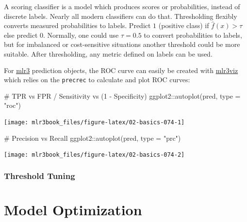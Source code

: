 \documentclass[
  11pt,
  parskip=half,
  DIV=calc,
  BCOR=10mm,
  x11names]{scrbook}
\newenvironment{Shaded}{}{}
\newcommand{\CommentTok}[1]{\textcolor[rgb]{0.00,0.50,0.00}{#1}}
\newcommand{\DataTypeTok}[1]{#1}
\newcommand{\KeywordTok}[1]{\textcolor[rgb]{0.00,0.00,1.00}{#1}}
\newcommand{\NormalTok}[1]{#1}
\newcommand{\OperatorTok}[1]{#1}
\newcommand{\StringTok}[1]{\textcolor[rgb]{0.00,0.50,0.50}{#1}}
\begin{document}
A scoring classifier is a model which produces scores or probabilities, instead of discrete labels.
Nearly all modern classifiers can do that.
Thresholding flexibly converts measured probabilities to labels.
Predict \(1\) (positive class) if \(\hat{f}(x) > \tau\) else predict \(0\).
Normally, one could use \(\tau = 0.5\) to convert probabilities to labels, but for imbalanced or cost-sensitive situations another threshold could be more suitable.
After thresholding, any metric defined on labels can be used.

For \href{https://mlr3.mlr-org.com}{mlr3} prediction objects, the ROC curve can easily be created with \href{https://mlr3viz.mlr-org.com}{mlr3viz} which relies on the \texttt{precrec} to calculate and plot ROC curves:

\begin{Shaded}
\begin{Highlighting}[]
\CommentTok{# TPR vs FPR / Sensitivity vs (1 - Specificity)}
\NormalTok{ggplot2}\OperatorTok{::}\KeywordTok{autoplot}\NormalTok{(pred, }\DataTypeTok{type =} \StringTok{"roc"}\NormalTok{)}
\end{Highlighting}
\end{Shaded}

\begin{center}\texttt{[image: mlr3book\_files/figure-latex/02-basics-074-1]} \end{center}

\begin{Shaded}
\begin{Highlighting}[]

\CommentTok{# Precision vs Recall}
\NormalTok{ggplot2}\OperatorTok{::}\KeywordTok{autoplot}\NormalTok{(pred, }\DataTypeTok{type =} \StringTok{"prc"}\NormalTok{)}
\end{Highlighting}
\end{Shaded}

\begin{center}\texttt{[image: mlr3book\_files/figure-latex/02-basics-074-2]} \end{center}

\hypertarget{threshold-tuning}{%
\subsection{Threshold Tuning}\label{threshold-tuning}}

\hypertarget{model-optim}{%
\chapter{Model Optimization}\label{model-optim}}
\end{document}
